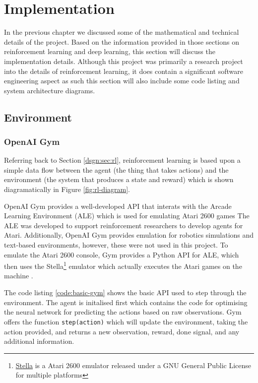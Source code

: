 \chapter{Implementation}
In the previous chapter we discussed some of the mathematical and technical details of the project. Based on the information provided in those sections on reinforcement learning and deep learning, this section will discuss the implementation details. Although this project was primarily a research project into the details of reinforcement learning, it does contain a significant software engineering aspect as such this section will also include some code listing and system architecture diagrams.

\section{Environment}
\subsection{OpenAI Gym}
Referring back to Section \ref{dsgn:sec:rl}, reinforcement learning is based upon a simple data flow between the agent (the thing that takes actions) and the environment (the system that produces a state and reward) which is shown diagramatically in Figure \ref{fig:rl-diagram}.

OpenAI Gym provides a well-developed API that interats with the Arcade Learning Environment (ALE) which is used for emulating Atari 2600 games The ALE was developed to support reinforcement researchers to develop agents for Atari\cite{bellemare13arcade}\cite{machado2017revisiting}. Additionally, OpenAI Gym provides emulation for robotics simulations and text-based environments, however, these were not used in this project. To emulate the Atari 2600 console, Gym provides a Python API for ALE, which then uses the Stella\footnote{\href{https://stella-emu.github.io/}{Stella} is a Atari 2600 emulator released under a GNU General Public License for multiple platforms} emulator which actually executes the Atari games on the machine \cite{brockman2016openai}.

The code listing \ref{code:basic-gym} shows the basic API used to step through the environment. The agent is initalised first which contains the code for optimising the neural network for predicting the actions based on raw observations. Gym offers the function \texttt{step(action)} which will update the environment, taking the action provided, and returns a new observation, reward, done signal, and any additional information.

